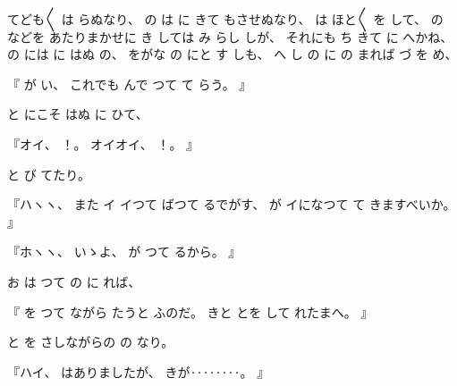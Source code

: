 
%
てども〳〵
は
らぬなり、
%
の
は
に
きて
もさせぬなり、
%
は
ほと〳〵
を
して、
%
の
などを
あたりまかせに
き
しては
み
らし
しが、
%
それにも
ち
きて
に
へかね、
%
の
には
に
はぬ
の、
%
をがな
の
にと
す%
しも、
%
へ
し
の
に
の
まれば
づ
を
め、

%
『
が
い、
%
これでも
んで
つて
て
らう。
』

%
と
にこそ
はぬ
に
ひて、

%
『オイ、
%
！。
%
オイオイ、
%
！。
』

%
と
び
てたり。

%
『ハヽヽ、
%
また
イ
イつて
ばつて
るでがす、
%
が
イになつて
て
きますべいか。
』

%
『ホヽヽ、
%
いゝよ、
%
が
つて
るから。
』

%
お
は
つて
の
に
れば、

%
『
を
つて
ながら
たうと
ふのだ。
%
きと
とを
して
れたまへ。
』

%
と
を
さしながらの
の
なり。

%
『ハイ、
%
はありましたが、
%
きが‥‥‥‥。
』

